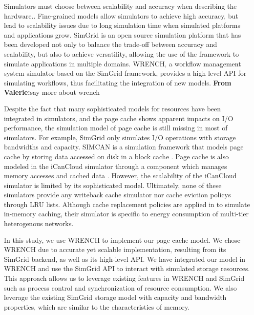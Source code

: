 \documentclass[conference]{IEEEtran}
\newcommand{\valerie}[1]{\color{blue}\textbf{From Valerie:}#1\color{black}}
\begin{document}
            Simulators must choose between scalability and accuracy when describing the
            hardware.\cite{casanova2014simgrid}. 
            Fine-grained models allow simulators to achieve high accuracy, 
            but lead to scalability issues due to long simulation time 
            when simulated platforms and applications grow. 
            SimGrid is an open source simulation platform that has been developed 
            not only to balance the trade-off between accuracy and scalability, 
            but also to achieve versatility, allowing the use of the framework 
            to simulate applications in multiple domains. WRENCH, a workflow management
            system simulator based on the SimGrid framework, provides a high-level API
            for simulating workflows, thus facilitating the integration of new models.
            \valerie{say more about wrench}
            
            Despite the fact that many sophisticated models for resources have been 
            integrated in simulators, and the page cache shows apparent impacts on I/O
            performance, the simulation model of page cache is still missing in most 
            of simulators.
            For example, SimGrid only simulates I/O operations with storage bandwidths 
            and capacity. 
            SIMCAN is a simulation framework that models page cache by storing data 
            accessed on disk in a block cache \cite{nunez2012simcan}. 
            Page cache is also modeled in the iCanCloud simulator through a component which
            manages memory accesses and cached data \cite{nunez2012icancloud}. However,
            the scalability of the iCanCloud simulator is limited by its sophisticated model.
            Ultimately, none of these simulators provide any writeback cache simulator nor
            cache eviction policys through LRU lists.
            Although cache replacement policies are applied in \cite{xu2018saving} to simulate 
            in-memory caching, their simulator is specific to energy consumption of multi-tier 
            heterogenous networks.
            

            In this study, we use WRENCH 
            to implement our page cache model. We chose WRENCH due to accurate yet scalable implementation, resulting
            from its SimGrid backend, as well as its high-level API.
            We have integrated our model in WRENCH and use the SimGrid API to interact with 
            simulated storage resources.
            This approach allows us to leverage existing features in WRENCH and SimGrid such as process control and synchronization of 
            resource consumption.
            We also leverage the existing SimGrid storage model with capacity 
            and bandwidth properties, which are similar to the characteristics of memory.
            
\end{document}
